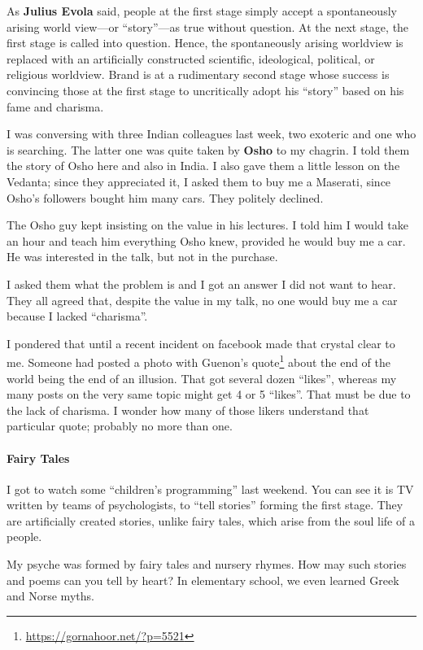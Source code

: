 As \textbf{Julius Evola} said, people at the first stage simply accept a spontaneously arising world view---or ``story''---as true without question. At the next stage, the first stage is called into question. Hence, the spontaneously arising worldview is replaced with an artificially constructed scientific, ideological, political, or religious worldview. Brand is at a rudimentary second stage whose success is convincing those at the first stage to uncritically adopt his ``story'' based on his fame and charisma.

I was conversing with three Indian colleagues last week, two exoteric and one who is searching. The latter one was quite taken by \textbf{Osho} to my chagrin. I told them the story of Osho here and also in India. I also gave them a little lesson on the Vedanta; since they appreciated it, I asked them to buy me a Maserati, since Osho's followers bought him many cars. They politely declined.

The Osho guy kept insisting on the value in his lectures. I told him I would take an hour and teach him everything Osho knew, provided he would buy me a car. He was interested in the talk, but not in the purchase.

I asked them what the problem is and I got an answer I did not want to hear. They all agreed that, despite the value in my talk, no one would buy me a car because I lacked ``charisma''.

I pondered that until a recent incident on facebook made that crystal clear to me. Someone had posted a photo with Guenon's quote\footnote{\url{https://gornahoor.net/?p=5521}} about the end of the world being the end of an illusion. That got several dozen ``likes'', whereas my many posts on the very same topic might get 4 or 5 ``likes''. That must be due to the lack of charisma. I wonder how many of those likers understand that particular quote; probably no more than one.

\paragraph{Fairy Tales}


I got to watch some ``children's programming'' last weekend. You can see it is TV written by teams of psychologists, to ``tell stories'' forming the first stage. They are artificially created stories, unlike fairy tales, which arise from the soul life of a people.

My psyche was formed by fairy tales and nursery rhymes. How may such stories and poems can you tell by heart? In elementary school, we even learned Greek and Norse myths.

